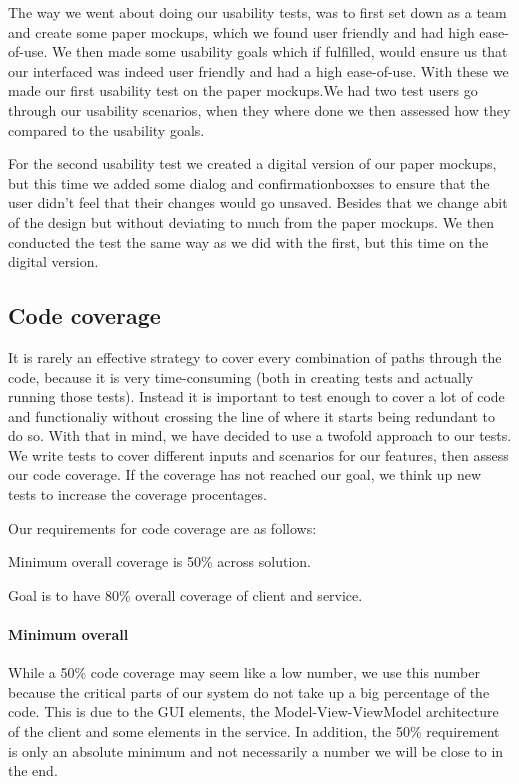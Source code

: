 The way we went about doing our usability tests, was to first set down as a team and create some paper mockups, which we found user friendly and had high ease-of-use. We then made some usability goals which if fulfilled, would ensure us that our interfaced was indeed user friendly and had a high ease-of-use. With these we made our first usability test on the paper mockups.We had two test users go through our usability scenarios, when they where done we then assessed how they compared to the usability goals.

For the second usability test we created a digital version of our paper mockups, but this time we added some dialog and confirmationboxses to ensure that the user didn't feel that their changes would go unsaved. Besides that we change abit of the design but without deviating to much from the paper mockups. We then conducted the test the same way as we did with the first, but this time on the digital version.

\subsection{Code coverage}
\label{Testing_Strategy_Coverage}
It is rarely an effective strategy to cover every combination of paths through the code, because it is very time-consuming (both in creating tests and actually running those tests). Instead it is important to test enough to cover a lot of code and functionaliy without crossing the line of where it starts being redundant to do so\cite{WoT}. With that in mind, we have decided to use a twofold approach to our tests. We write tests to cover different inputs and scenarios for our features, then assess our code coverage. If the coverage has not reached our goal, we think up new tests to increase the coverage procentages.

Our requirements for code coverage are as follows:
\begin{my_itemize}
\item Minimum overall coverage is 50\% across solution.
\item Goal is to have 80\% overall coverage of client and service.
\end{my_itemize}

\paragraph{Minimum overall}
While a 50\% code coverage may seem like a low number, we use this number because the critical parts of our system do not take up a big percentage of the code. This is due to the GUI elements, the Model-View-ViewModel architecture of the client and some elements in the service. In addition, the 50\% requirement is only an absolute minimum and not necessarily a number we will be close to in the end.

